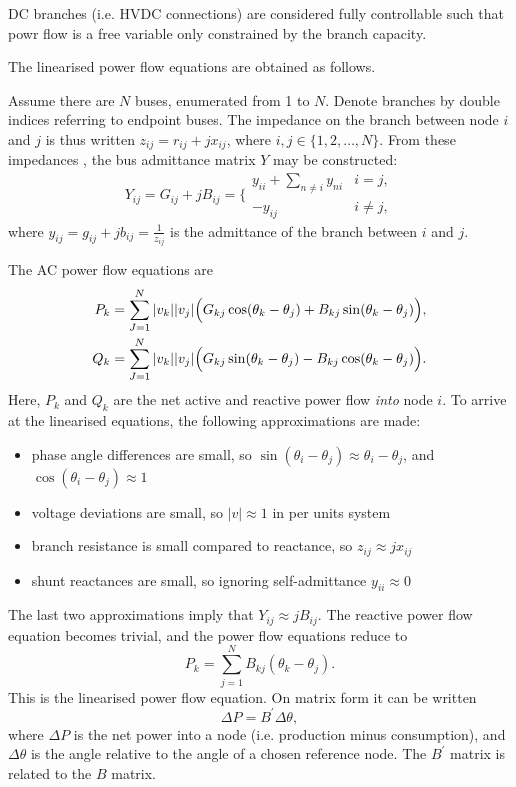 \documentclass{article}
\begin{document}
DC branches (i.e. HVDC connections) are considered fully controllable such that powr flow is a free variable only constrained by the branch capacity.

The linearised power flow equations are obtained as follows. 

Assume there are $N$ buses, enumerated from 1 to $N$. Denote branches by double indices referring to endpoint buses. The impedance on the branch between node $i$ and $j$ is thus written $z_{ij} = r_{ij} + j x_{ij}$, where $i,j \in \{1,2,\dots, N\}$.
From these impedances , the bus admittance matrix $Y$ may be constructed:
\begin{equation}
	Y_{ij} = G_{ij}+jB_{ij} = \bigg\{ \begin{array}{ll} 
		y_{ii} + \sum_{n\neq i} y_{ni}	& i=j, \\
		-y_{ij}					& i\neq j,
	\end{array}
\end{equation}
where $y_{ij} = g_{ij} + j b_{ij} = \frac{1}{z_{ij}}$ is the admittance of the branch between $i$ and $j$.

The AC power flow equations are
\begin{equation}
\begin{split}
	P_k & = \sum_{J=1}^N |v_k| |v_j| \Bigl(G_{kj}\cos(\theta_k-\theta_j) + B_{kj}\sin(\theta_k-\theta_j) \Bigr),
	\\
	Q_k & = \sum_{J=1}^N |v_k| |v_j| \Bigl(G_{kj}\sin(\theta_k-\theta_j) - B_{kj}\cos(\theta_k-\theta_j) \Bigr).
\end{split}
\end{equation}
Here, $P_k$ and $Q_k$ are the net active and reactive power flow \emph{into} node $i$.
To arrive at the linearised equations, the following approximations are made:
\begin{itemize}
\item phase angle differences are small, so 
	$\sin(\theta_i-\theta_j)\approx \theta_i-\theta_j$, and
	$\cos(\theta_i-\theta_j)\approx 1$
\item voltage deviations are small, so $|v| \approx 1$ in per units system
\item branch resistance is small compared to reactance, so $z_{ij} \approx j x_{ij}$
\item shunt reactances are small, so ignoring self-admittance $y_{ii}\approx 0$
\end{itemize}
The last two approximations imply that $Y_{ij}\approx jB_{ij}$. The reactive power flow equation becomes trivial, and the power flow equations reduce to
\begin{equation}
	P_k  = \sum_{j=1}^N   B_{kj}(\theta_k-\theta_j).
\end{equation}
This is the linearised power flow equation. On matrix form it can be written
\begin{equation}
	\Delta P = B^\prime \Delta\theta,
\end{equation}
where $\Delta P$ is the net power into a node (i.e. production minus consumption), 
and $\Delta\theta$ is the angle relative to the angle of a chosen reference node. 
The $B^\prime$ matrix is related to the $B$ matrix.
\end{document}
